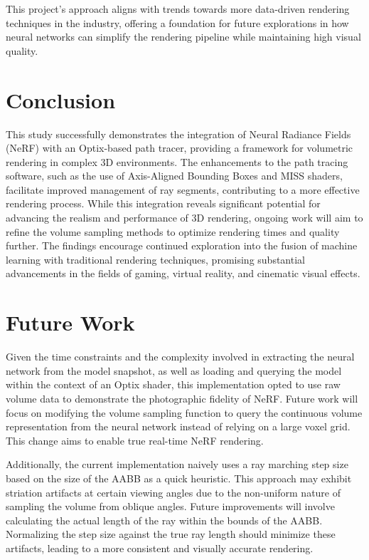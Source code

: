 \documentclass[conference]{IEEEtran}
\begin{document}
This project's approach aligns with trends towards more data-driven rendering techniques in the industry, offering a foundation for future explorations in how neural networks can simplify the rendering pipeline while maintaining high visual quality.



\section{Conclusion}

This study successfully demonstrates the integration of Neural Radiance Fields (NeRF) with an Optix-based path tracer, providing a framework for volumetric rendering in complex 3D environments. The enhancements to the path tracing software, such as the use of Axis-Aligned Bounding Boxes and MISS shaders, facilitate improved management of ray segments, contributing to a more effective rendering process. While this integration reveals significant potential for advancing the realism and performance of 3D rendering, ongoing work will aim to refine the volume sampling methods to optimize rendering times and quality further. The findings encourage continued exploration into the fusion of machine learning with traditional rendering techniques, promising substantial advancements in the fields of gaming, virtual reality, and cinematic visual effects.


\section{Future Work}

Given the time constraints and the complexity involved in extracting the neural network from the model snapshot, as well as loading and querying the model within the context of an Optix shader, this implementation opted to use raw volume data to demonstrate the photographic fidelity of NeRF. Future work will focus on modifying the volume sampling function to query the continuous volume representation from the neural network instead of relying on a large voxel grid. This change aims to enable true real-time NeRF rendering.

Additionally, the current implementation naively uses a ray marching step size based on the size of the AABB as a quick heuristic. This approach may exhibit striation artifacts at certain viewing angles due to the non-uniform nature of sampling the volume from oblique angles. Future improvements will involve calculating the actual length of the ray within the bounds of the AABB. Normalizing the step size against the true ray length should minimize these artifacts, leading to a more consistent and visually accurate rendering.






\end{document}
